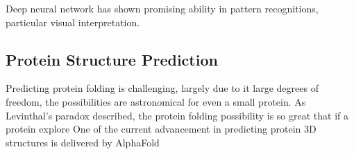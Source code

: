 Deep neural network has shown promising ability in pattern recognitions, particular visual interpretation.
\par 

\subsection{Protein Structure Prediction}
Predicting protein folding is challenging, largely due to it large degrees of freedom, the possibilities are astronomical for even a small protein. As Levinthal's paradox described, the protein folding possibility is so great that if a protein explore  One of the current advancement in predicting protein 3D structures is delivered by AlphaFold
